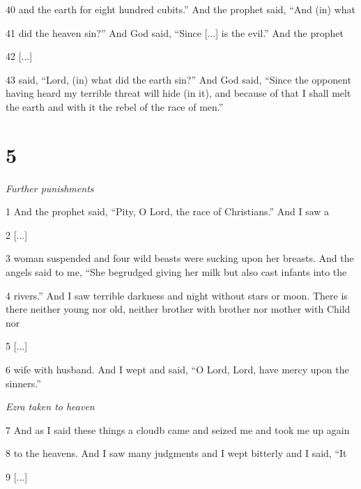 \par 40 and the earth for eight hundred cubits.” And the prophet said, “And (in) what

\par 41 did the heaven sin?” And God said, “Since [...] is the evil.” And the prophet

\par 42 [...]

\par 43 said, “Lord, (in) what did the earth sin?” And God said, “Since the opponent having heard my terrible threat will hide (in it), and because of that I shall melt the earth and with it the rebel of the race of men.”

\chapter{5}

\par \textit{Further punishments}

\par 1 And the prophet said, “Pity, O Lord, the race of Christians.” And I saw a

\par 2 [...]

\par 3 woman suspended and four wild beasts were sucking upon her breasts. And the angels said to me, “She begrudged giving her milk but also cast infants into the 

\par 4 rivers.” And I saw terrible darkness and night without stars or moon. There is there neither young nor old, neither brother with brother nor mother with Child nor

\par 5 [...]

\par 6 wife with husband. And I wept and said, “O Lord, Lord, have mercy upon the sinners.”

\par \textit{Ezra taken to heaven}

\par 7 And as I said these things a cloudb came and seized me and took me up again

\par 8 to the heavens. And I saw many judgments and I wept bitterly and I said, “It

\par 9 [...]

